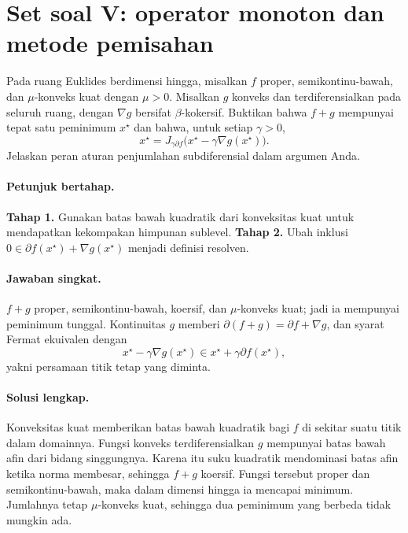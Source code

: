 
\section{Set soal V: operator monoton dan metode pemisahan}
\label{orig03:ps05}

\begin{exercise}
\label{orig03:ps05:exercise:0001}
Pada ruang Euklides berdimensi hingga, misalkan $f$ proper, semikontinu-bawah,
dan $\mu$-konveks kuat dengan $\mu>0$. Misalkan $g$ konveks dan
terdiferensialkan pada seluruh ruang, dengan $\nabla g$ bersifat
$\beta$-kokersif. Buktikan bahwa $f+g$ mempunyai tepat satu peminimum $x^\star$
dan bahwa, untuk setiap $\gamma>0$,
\[
 x^\star=J_{\gamma\partial f}
 \bigl(x^\star-\gamma\nabla g(x^\star)\bigr).
\]
Jelaskan peran aturan penjumlahan subdiferensial dalam argumen Anda.
\end{exercise}

\paragraph{Petunjuk bertahap.}
\label{orig03:ps05:hint:0001}
\textbf{Tahap 1.} Gunakan batas bawah kuadratik dari konveksitas kuat untuk
mendapatkan kekompakan himpunan sublevel.
\textbf{Tahap 2.} Ubah inklusi
$0\in\partial f(x^\star)+\nabla g(x^\star)$ menjadi definisi resolven.

\paragraph{Jawaban singkat.}
\label{orig03:ps05:answer:0001}
$f+g$ proper, semikontinu-bawah, koersif, dan $\mu$-konveks kuat; jadi ia
mempunyai peminimum tunggal. Kontinuitas $g$ memberi
$\partial(f+g)=\partial f+\nabla g$, dan syarat Fermat ekuivalen dengan
\[
 x^\star-\gamma\nabla g(x^\star)
 \in x^\star+\gamma\partial f(x^\star),
\]
yakni persamaan titik tetap yang diminta.

\paragraph{Solusi lengkap.}
\label{orig03:ps05:solution:0001}
Konveksitas kuat memberikan batas bawah kuadratik bagi $f$ di sekitar suatu
titik dalam domainnya. Fungsi konveks terdiferensialkan $g$ mempunyai batas
bawah afin dari bidang singgungnya. Karena itu suku kuadratik mendominasi
batas afin ketika norma membesar, sehingga $f+g$ koersif. Fungsi tersebut
proper dan semikontinu-bawah, maka dalam dimensi hingga ia mencapai minimum.
Jumlahnya tetap $\mu$-konveks kuat, sehingga dua peminimum yang berbeda tidak
mungkin ada.


